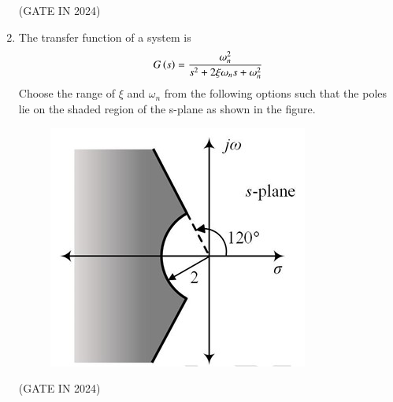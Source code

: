 \documentclass[journal,12pt,onecolumn]{IEEEtran}
\theoremstyle{remark}
\begin{document}
\begin{enumerate}
    \hfill{(GATE IN 2024)}
    \begin{enumerate}
    \end{enumerate}

    \item The transfer function of a system is
    \begin{align*}
        G\left(s\right) = \frac{\omega_n^2}{s^2 + 2\xi\omega_n s + \omega_n^2}
    \end{align*}
    Choose the range of $\xi$ and $\omega_n$  from the following options such that the poles lie on the shaded region of the s-plane as shown in the figure. 
    \begin{figure}[H]
        \centering
        \includegraphics[width=0.5\columnwidth]{figs/p23.jpg}
        \caption*{}
        \label{fig:p23}
    \end{figure}
    
    \hfill{(GATE IN 2024)}
    \begin{enumerate}
    \end{enumerate}


\end{enumerate}
\end{document}
